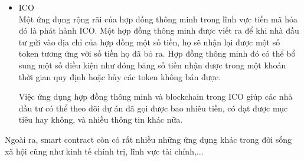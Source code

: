 \begin{itemize}
	\item{ICO}\\
	Một ứng dụng rộng rãi của hợp đồng thông minh trong lĩnh vực tiền mã hóa đó là phát hành ICO. Một hợp đồng thông minh được viết ra để khi nhà đầu tư gửi vào địa chỉ của hợp đồng một số tiền, họ sẽ nhận lại được một số token tương ứng với số tiền họ đã bỏ ra. Hợp đồng thông minh đó có thể bổ sung một số điều kiện như đóng băng số tiền nhận được trong một khoản thời gian quy định hoặc hủy các token không bán được.
	
	Việc ứng dụng hợp đồng thông minh và blockchain trong ICO giúp các nhà đầu tư có thể theo dõi dự án đã gọi được bao nhiêu tiền, có đạt được mục tiêu hay không, và nhiều thông tin khác nữa.
	
\end{itemize}

Ngoài ra, smart contract còn có rất nhiều những ứng dụng khác trong đời sống xã hội cũng như kinh tế chính trị, lĩnh vực tài chính,...